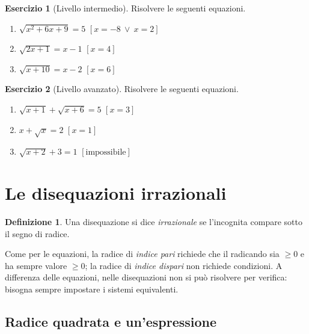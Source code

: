 \documentclass[12pt,a4paper,openany]{book}
\theoremstyle{definition}
\newtheorem{definizione}{Definizione}[section]
\newtheorem{esercizio}{Esercizio}[section]
\theoremstyle{plain}
\theoremstyle{remark}
\begin{document}
\begin{esercizio}[Livello intermedio]
Risolvere le seguenti equazioni.
\begin{enumerate}[label=\alph*)]
\item $\sqrt{x^2+6x+9}=5$ \hfill $[x=-8\ \lor\ x=2]$
\item $\sqrt{2x+1}=x-1$ \hfill $[x=4]$
\item $\sqrt{x+10}=x-2$ \hfill $[x=6]$
\end{enumerate}
\end{esercizio}

\begin{esercizio}[Livello avanzato]
Risolvere le seguenti equazioni.
\begin{enumerate}[label=\alph*)]
\item $\sqrt{x+1}+\sqrt{x+6}=5$ \hfill $[x=3]$
\item $x+\sqrt{x}=2$ \hfill $[x=1]$
\item $\sqrt{x+2}+3=1$ \hfill $[\text{impossibile}]$
\end{enumerate}
\end{esercizio}

\section{Le disequazioni irrazionali}

\begin{definizione}
Una disequazione si dice \emph{irrazionale} se l'incognita compare sotto il segno di radice.
\end{definizione}

Come per le equazioni, la radice di \emph{indice pari} richiede che il radicando sia $\ge 0$ e ha sempre valore $\ge 0$; la radice di \emph{indice dispari} non richiede condizioni. A differenza delle equazioni, nelle disequazioni non si può risolvere per verifica: bisogna sempre impostare i sistemi equivalenti.

\subsection*{Radice quadrata e un'espressione}
\end{document}
